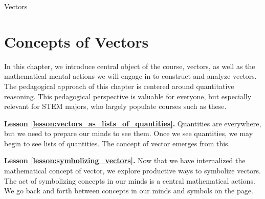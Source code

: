\chaptername{Vectors}
\section{Concepts of Vectors}

In this chapter, we introduce central object of the course, vectors, as well as the mathematical mental actions we will engage in to construct and analyze vectors.  The pedagogical approach of this chapter is centered around quantitative reasoning.  This pedagogical perspective is valuable for everyone, but especially relevant for STEM majors, who largely populate courses such as these.

\textbf{Lesson \ref{lesson:vectors_as_lists_of_quantities}.}  Quantities are everywhere, but we need to prepare our minds to see them.  Once we see quantities, we may begin to see lists of quantities.  The concept of vector emerges from this.


\textbf{Lesson \ref{lesson:symbolizing_vectors}.}  Now that we have internalized the mathematical concept of vector, we explore productive ways to symbolize vectors.  The act of symbolizing concepts in our minds is a central mathematical actions.  We go back and forth between concepts in our minds and symbols on the page.  


